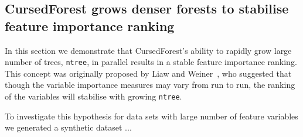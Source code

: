 \documentclass[10pt,a4paper]{article}  %
\newcommand{\cursedforest}{{\sc CursedForest}}
\let\oldmarginpar\marginpar
\renewcommand\marginpar[1]{\-\oldmarginpar[\raggedleft\footnotesize #1]%
{\raggedright\footnotesize #1}}
\begin{document}
\subsection{CursedForest grows denser forests to stabilise feature importance ranking}
In this section we demonstrate that \cursedforest 's ability to rapidly grow large number of trees, \texttt{ntree}, in parallel results in a stable feature importance ranking.
This concept was originally proposed by Liaw and Weiner~\cite{Liaw.and.Weiner.2002}, who suggested that though the variable importance measures may vary from run to run, the ranking of the variables will stabilise with growing \texttt{ntree}. 

To investigate this hypothesis for data sets with large number of feature variables we generated a synthetic dataset ...
  


\end{document}

